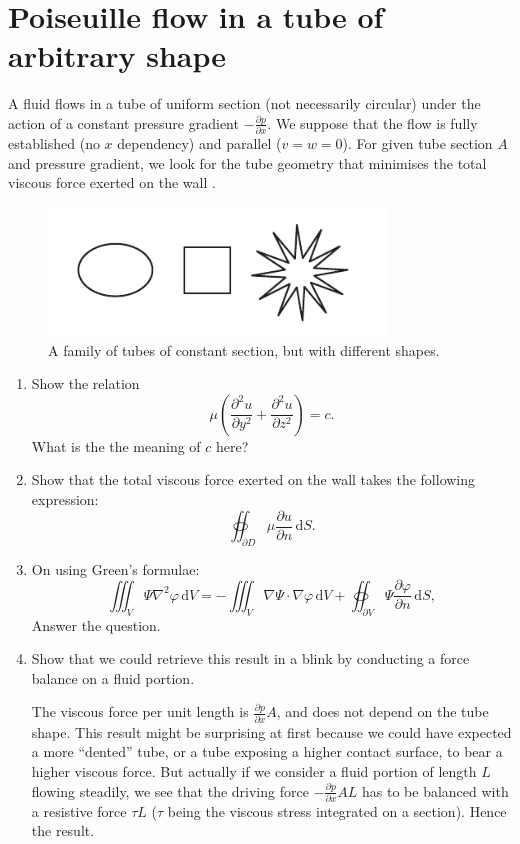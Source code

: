 \documentclass[11pt,a4paper]{article}
\newcommand{\pd}[2]{\frac{\partial #1}{\partial #2}}
\begin{document}
\section{Poiseuille flow in a tube of arbitrary shape}
\noindent A fluid flows in a tube of uniform section (not necessarily circular) under the action of a constant pressure gradient $-\frac{\partial p}{\partial x}$. We suppose that the flow is fully established (no $x$ dependency) and parallel ($v = w = 0$). For given tube section $A$ and pressure gradient, we look for the tube geometry that minimises the total viscous force exerted on the wall \citep{Ockendon1995}.
\begin{figure}[h]
\begin{center}
\includegraphics[width=9cm]{poiseuille_shapes.pdf}
\end{center}
\caption{A family of tubes of constant section, but with different shapes.}
\end{figure}

\begin{enumerate}
\item Show the relation 
$$
\mu\left( \frac{\partial^2 u}{\partial y^2} + \frac{\partial^2 u}{\partial z^2} \right) = c.
$$
What is the the meaning of $c$ here?
\item Show that the total viscous force exerted on the wall takes the following expression:
$$
\oiint_{\partial D} \mu \frac{\partial u}{\partial n} \, \mathrm dS.
$$
\item On using Green's formulae:
$$
\iiint_V \Psi \nabla^2 \varphi\,\mathrm dV = - \iiint_V \nabla \Psi \cdot \nabla \varphi\,\mathrm dV + \oiint_{\partial V} \Psi \frac{\partial \varphi}{\partial n} \, \mathrm dS,
$$
Answer the question.
\item Show that we could retrieve this result in a blink by conducting a force balance on a fluid portion.
\begin{answer}
The viscous force per unit length is $\pd{p}{x} A$, and does not depend on the tube shape. This result might be surprising at first because we could have expected a more ``dented'' tube, or a tube exposing a higher contact surface, to bear a higher viscous force.
But actually if we consider a fluid portion of length $L$ flowing steadily, we see that the driving force $-\pd{p}{x} A L$ has to be balanced with a resistive force $\tau L$ ($\tau$ being the viscous stress integrated on a section). Hence the result.
\end{answer}

\end{enumerate}


\end{document}
